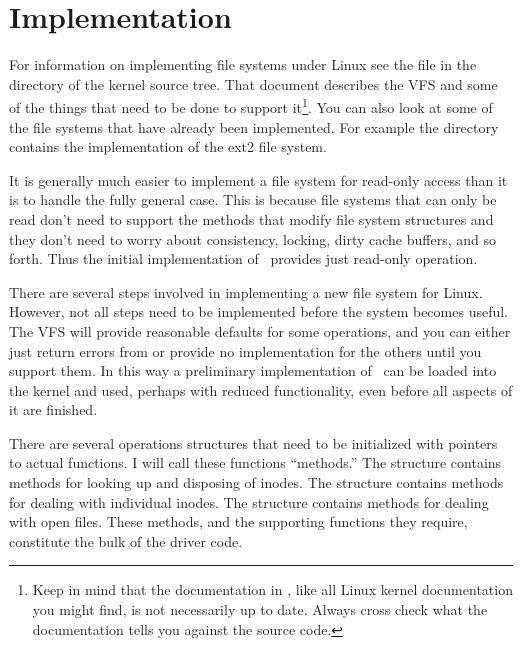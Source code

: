 %
%
%
%

\section{Implementation}
\label{sec:implementation}

For information on implementing file systems under Linux see the file  in the
 directory of the kernel source tree. That document
describes the VFS and some of the things that need to be done to support it\footnote{Keep in
  mind that the documentation in , like all Linux kernel documentation
  you might find, is not necessarily up to date. Always cross check what the documentation tells
  you against the source code.}. You can also look at some of the file systems that have already
been implemented. For example the directory  contains the implementation of
the ext2 file system.

It is generally much easier to implement a file system for read-only access than it is to handle
the fully general case. This is because file systems that can only be read don't need to support
the methods that modify file system structures and they don't need to worry about consistency,
locking, dirty cache buffers, and so forth. Thus the initial implementation of \GenericFS\
provides just read-only operation.

There are several steps involved in implementing a new file system for Linux. However, not all
steps need to be implemented before the system becomes useful. The VFS will provide reasonable
defaults for some operations, and you can either just return errors from or provide no
implementation for the others until you support them. In this way a preliminary implementation
of \GenericFS\ can be loaded into the kernel and used, perhaps with reduced functionality, even
before all aspects of it are finished.

There are several operations structures that need to be initialized with pointers to actual
functions. I will call these functions ``methods.'' The \code{super_block} structure contains
methods for looking up and disposing of inodes. The \code{inode_operations} structure contains
methods for dealing with individual inodes. The \code{file_operations} structure contains
methods for dealing with open files. These methods, and the supporting functions they require,
constitute the bulk of the driver code.

